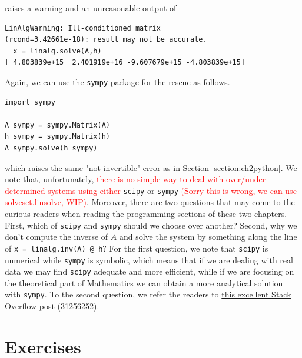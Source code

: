 raises a warning and an unreasonable output of
\begin{lstlisting}
LinAlgWarning: Ill-conditioned matrix 
(rcond=3.42661e-18): result may not be accurate.
  x = linalg.solve(A,h)
[ 4.803839e+15  2.401919e+16 -9.607679e+15 -4.803839e+15]   
\end{lstlisting}
Again, we can use the \verb|sympy| package for the rescue as follows.
\begin{lstlisting}
import sympy

A_sympy = sympy.Matrix(A)
h_sympy = sympy.Matrix(h)
A_sympy.solve(h_sympy)
\end{lstlisting}
which raises the same "not invertible" error as in Section \ref{section:ch2python}. We note that, unfortunately, \textcolor{red}{there is no simple way to deal with over/under-determined systems using either} \verb|scipy| or \verb|sympy| \textcolor{red}{(Sorry this is wrong, we can use solveset.linsolve, WIP)}. Moreover, there are two questions that may come to the curious readers when reading the programming sections of these two chapters. First, which of \verb|scipy| and \verb|sympy| should we choose over another? Second, why we don't compute the inverse of $A$ and solve the system by something along the line of \verb|x = linalg.inv(A) @ h|? For the first question, we note that \verb|scipy| is numerical while \verb|sympy| is symbolic, which means that if we are dealing with real data we may find \verb|scipy| adequate and more efficient, while if we are focusing on the theoretical part of Mathematics we can obtain a more analytical solution with \verb|sympy|. To the second question, we refer the readers to \href{https://stackoverflow.com/questions/31256252/why-does-numpy-linalg-solve-offer-more-precise-matrix-inversions-than-numpy-li}{this excellent Stack Overflow post} (31256252).
\section{Exercises}

